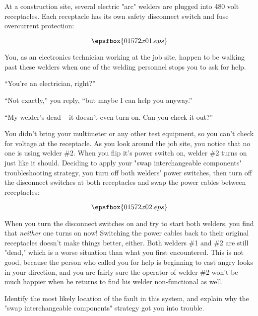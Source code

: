 

At a construction site, several electric "arc" welders are plugged into 480 volt receptacles.  Each receptacle has its own safety disconnect switch and fuse overcurrent protection:

$$\epsfbox{01572x01.eps}$$

You, as an electronics technician working at the job site, happen to be walking past these welders when one of the welding personnel stops you to ask for help.

\vskip 5pt

``You're an electrician, right?''

\vskip 5pt

``Not exactly,'' you reply, ``but maybe I can help you anyway.''

\vskip 5pt

``My welder's dead -- it doesn't even turn on.  Can you check it out?''

\vskip 5pt

You didn't bring your multimeter or any other test equipment, so you can't check for voltage at the receptacle.  As you look around the job site, you notice that no one is using welder \#2.  When you flip it's power switch on, welder \#2 turns on just like it should.  Deciding to apply your "swap interchangeable components" troubleshooting strategy, you turn off both welders' power switches, then turn off the disconnect switches at both receptacles and swap the power cables between receptacles:

$$\epsfbox{01572x02.eps}$$

When you turn the disconnect switches on and try to start both welders, you find that {\it neither} one turns on now!  Switching the power cables back to their original receptacles doesn't make things better, either.  Both welders \#1 and \#2 are still "dead," which is a worse situation than what you first encountered.  This is not good, because the person who called you for help is beginning to cast angry looks in your direction, and you are fairly sure the operator of welder \#2 won't be much happier when he returns to find his welder non-functional as well.

Identify the most likely location of the fault in this system, and explain why the "swap interchangeable components" strategy got you into trouble.

